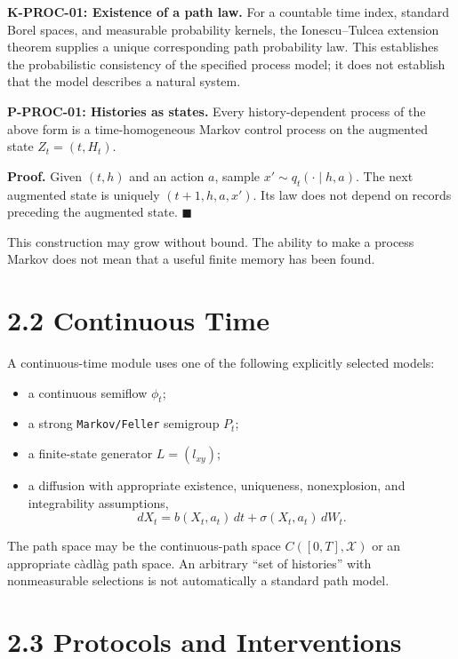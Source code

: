 \documentclass[
  english,
  11pt,
  oneside]{book}
\newcounter{none} %
\providecommand{\tightlist}{%
  \setlength{\itemsep}{0pt}\setlength{\parskip}{0pt}}
\begin{document}
\textbf{K-PROC-01: Existence of a path law.} For a countable time index, standard Borel spaces, and measurable probability kernels, the Ionescu--Tulcea extension theorem supplies a unique corresponding path probability law. This establishes the probabilistic consistency of the specified process model; it does not establish that the model describes a natural system.

\hypertarget{p-proc-01}{}\label{p-proc-01}

\textbf{P-PROC-01: Histories as states.} Every history-dependent process of the above form is a time-homogeneous Markov control process on the augmented state \(Z_t=(t,H_t)\).

\textbf{Proof.} Given \((t,h)\) and an action \(a\), sample \(x'\sim q_t(\cdot\mid h,a)\). The next augmented state is uniquely \((t+1,h,a,x')\). Its law does not depend on records preceding the augmented state. \(\blacksquare\)

This construction may grow without bound. The ability to make a process Markov does not mean that a useful finite memory has been found.

\section{2.2 Continuous Time}\label{continuous-time}

A continuous-time module uses one of the following explicitly selected models:

\begin{itemize}
\tightlist
\item
  a continuous semiflow \(\phi_t\);
\item
  a strong \nolinkurl{Markov/Feller} semigroup \(P_t\);
\item
  a finite-state generator \(L=(l_{xy})\);
\item
  a diffusion with appropriate existence, uniqueness, nonexplosion, and integrability assumptions, \[dX_t=b(X_t,a_t)\,dt+\sigma(X_t,a_t)\,dW_t.\]
\end{itemize}

The path space may be the continuous-path space \(C([0,T],\mathcal X)\) or an appropriate càdlàg path space. An arbitrary ``set of histories'' with nonmeasurable selections is not automatically a standard path model.

\section{2.3 Protocols and Interventions}\label{protocols-and-interventions}
\end{document}
